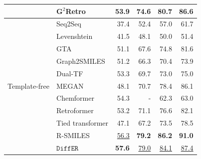 \documentclass{article}
\newcommand{\ours}{$\texttt{DiffER}$\xspace}
\begin{document}
\begin{table}[h!]
\begin{tabular}{l l r r r r}
                                          & G$^2$Retro \cite{chen2023g} & \textbf{53.9} & \textbf{74.6} & \textbf{80.7} & \textbf{86.6} \\
        \midrule
        \multirow{11}{*}{Template-free} & Seq2Seq \cite{liu2017retrosynthetic} & 37.4 & 52.4 & 57.0 & 61.7 \\
                                          & Levenshtein \cite{sumner2020levenshtein} & 41.5 & 48.1 & 50.0 & 51.4 \\
                                          & GTA \cite{seo2021gta} & 51.1 & 67.6 & 74.8 & 81.6 \\
                                          & Graph2SMILES \cite{tu2022permutation} & 51.2 & 66.3 & 70.4 & 73.9 \\
                                          & Dual-TF \cite{sun2021towards} & 53.3 & 69.7 & 73.0 & 75.0 \\
                                          & MEGAN \cite{sacha2021molecule} & 48.1 & 70.7 & 78.4 & 86.1 \\
                                          & Chemformer \cite{irwin2022chemformer} & 54.3 & - & 62.3 & 63.0 \\
                                          & Retroformer \cite{wan2022retroformer} & 53.2 & 71.1 & 76.6 & 82.1 \\
                                          & Tied transformer \cite{kim2021valid} & 47.1 & 67.2 & 73.5 & 78.5 \\
                                          & R-SMILES \cite{zhong2022root} & \underline{56.3} & \textbf{79.2} & \textbf{86.2} & \textbf{91.0} \\
        \cmidrule(lr){2-6}                                   
                                          & \ours & \textbf{57.6} & \underline{79.0} & \underline{84.1} & \underline{87.4} \\
        \midrule
                                           
    \end{tabular}
    \label{tab:topk}
\end{table}
\end{document}
